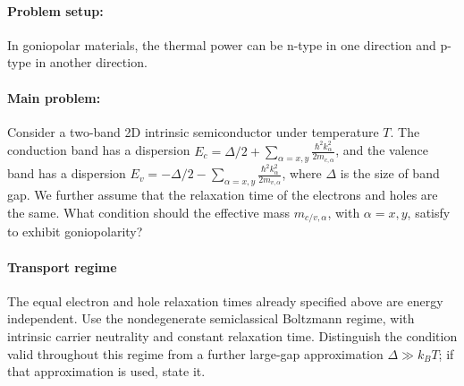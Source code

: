 \documentclass[11pt]{article}
\begin{document}
\paragraph*{Problem setup:}
In goniopolar materials, the thermal power can be n-type in one direction and p-type in another direction.

\paragraph*{Main problem:}
Consider a two-band 2D intrinsic semiconductor under temperature $T$. The conduction band has a dispersion $E_c= \Delta/2+\sum_{\alpha=x,y}\frac{\hbar^2k_{\alpha}^2}{2m_{c,\alpha}}$, and the valence band has a dispersion $E_v= -\Delta/2-\sum_{\alpha=x,y}\frac{\hbar^2k_{\alpha}^2}{2m_{v,\alpha}}$, where $\Delta$ is the size of band gap. We further assume that the relaxation time of the electrons and holes are the same. What condition should the effective mass $m_{c/v,\alpha}$, with $ \alpha=x,y$, satisfy to exhibit goniopolarity?



\paragraph*{Transport regime}
The equal electron and hole relaxation times already specified above are
energy independent. Use the nondegenerate semiclassical Boltzmann regime,
with intrinsic carrier neutrality and constant relaxation time. Distinguish
the condition valid throughout this regime from a further large-gap
approximation $\Delta\gg k_BT$; if that approximation is used, state it.
\end{document}
